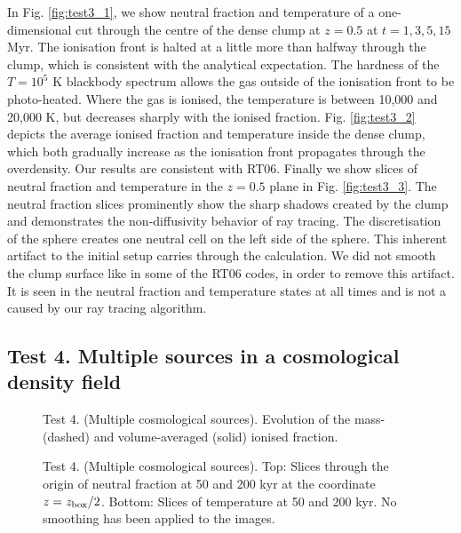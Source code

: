 \documentclass[useAMS,usenatbib]{mn2e}
\begin{document}
In Fig. \ref{fig:test3_1}, we show neutral fraction and temperature
of a one-dimensional cut through the centre of the dense clump at $z =
0.5$ at $t = 1, 3, 5, 15$ Myr.  The ionisation front is halted at a
little more than halfway through the clump, which is consistent with
the analytical expectation.  The hardness of the $T = 10^5$ K
blackbody spectrum allows the gas outside of the ionisation front to
be photo-heated.  Where the gas is ionised, the temperature is between
10,000 and 20,000 K, but decreases sharply with the ionised fraction.
Fig. \ref{fig:test3_2} depicts the average ionised fraction and
temperature inside the dense clump, which both gradually increase as
the ionisation front propagates through the overdensity.  Our results
are consistent with RT06.  Finally we show slices of neutral fraction
and temperature in the $z = 0.5$ plane in Fig. \ref{fig:test3_3}.
The neutral fraction slices prominently show the sharp shadows created
by the clump and demonstrates the non-diffusivity behavior of ray
tracing.  The discretisation of the sphere creates one neutral cell on
the left side of the sphere.  This inherent artifact to the initial
setup carries through the calculation.  We did not smooth the clump
surface like in some of the RT06 codes, in order to remove this
artifact.  It is seen in the neutral fraction and temperature states
at all times and is not a caused by our ray tracing algorithm.

\subsection{Test 4. Multiple sources in a cosmological density field}

\begin{figure}
  \caption{\label{fig:test4_1} Test 4. (Multiple cosmological
    sources).  Evolution of the mass- (dashed) and volume-averaged
    (solid) ionised fraction.}
\end{figure}

\begin{figure*}
  \caption{\label{fig:test4_2} Test 4. (Multiple cosmological
    sources).  Top: Slices through the origin of neutral fraction at
    50 and 200 kyr at the coordinate $z = z_{\rm box}/2$.  Bottom:
    Slices of temperature at 50 and 200 kyr.  No smoothing has been
    applied to the images.}
\end{figure*}
\end{document}
